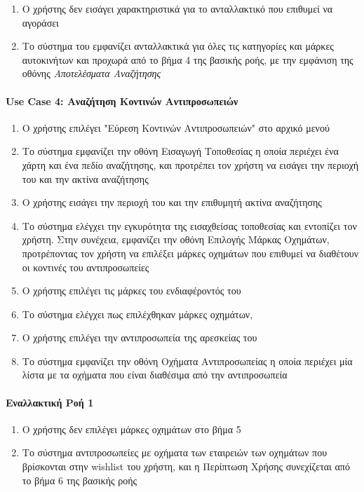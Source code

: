 \documentclass{../ol-softwaremanual}
\begin{document}
	\begin{enumerate}
		\item Ο χρήστης δεν εισάγει χαρακτηριστικά για το ανταλλακτικό που επιθυμεί να αγοράσει
		\item Το σύστημα του εμφανίζει ανταλλακτικά για όλες τις κατηγορίες και μάρκες αυτοκινήτων και προχωρά από το βήμα 4 της βασικής ροής, με την εμφάνιση της οθόνης \textit{Αποτελέσματα Αναζήτησης}
	\end{enumerate}
	
	\paragraph{\en Use Case 4: \gr Αναζήτηση Κοντινών Αντιπροσωπειών}	
	
	\begin{enumerate}
		\item Ο χρήστης επιλέγει  \en"\gr Εύρεση Κοντινών Αντιπροσωπειών\en" \gr στο αρχικό μενού
		\item Το σύστημα εμφανίζει την οθόνη Εισαγωγή Τοποθεσίας η οποία περιέχει ένα χάρτη και ένα πεδίο αναζήτησης, και προτρέπει τον χρήστη να εισάγει την περιοχή του και την ακτίνα αναζήτησης
		\item Ο χρήστης εισάγει την περιοχή του και την επιθυμητή ακτίνα αναζήτησης		
		\item Το σύστημα ελέγχει την εγκυρότητα της εισαχθείσας τοποθεσίας και εντοπίζει τον χρήστη. Στην συνέχεια, εμφανίζει την οθόνη Επιλογής Μάρκας Οχημάτων, προτρέποντας τον χρήστη να επιλέξει μάρκες οχημάτων που επιθυμεί να διαθέτουν οι κοντινές του αντιπροσωπείες
		\item Ο χρήστης επιλέγει τις μάρκες του ενδιαφέροντός του			
		\item Το σύστημα ελέγχει πως επιλέχθηκαν μάρκες οχημάτων, 
		\item Ο χρήστης επιλέγει την αντιπροσωπεία της αρεσκείας του
		\item Το σύστημα εμφανίζει την οθόνη Οχήματα Αντιπροσωπείας η οποία περιέχει μία λίστα με τα οχήματα που είναι διαθέσιμα από την αντιπροσωπεία     	
	\end{enumerate}
	
	\paragraph{Εναλλακτική Ροή 1}
		\begin{enumerate}
			\item Ο χρήστης δεν επιλέγει μάρκες οχημάτων στο βήμα 5
			\item Το σύστημα  αντιπροσωπείες με οχήματα των εταιρειών των οχημάτων που βρίσκονται στην \en wishlist \gr του χρήστη, και η Περίπτωση Χρήσης συνεχίζεται από το βήμα 6 της βασικής ροής
	\end{enumerate}
	
\end{document}
